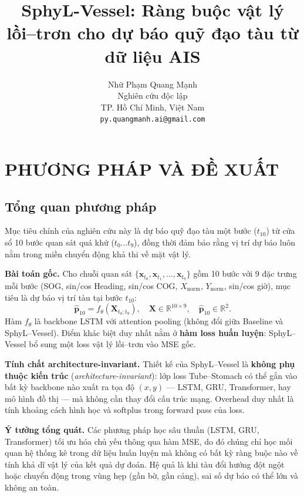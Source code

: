 \documentclass{IEEEtran}
\title{SphyL-Vessel: Ràng buộc vật lý lồi--trơn cho dự báo quỹ đạo tàu từ dữ liệu AIS}
\author{
  Nhữ Phạm Quang Mạnh\\
  Nghiên cứu độc lập\\
  TP. Hồ Chí Minh, Việt Nam\\
  \texttt{py.quangmanh.ai@gmail.com}
}
\begin{document}
\section{PHƯƠNG PHÁP VÀ ĐỀ XUẤT}

\subsection{Tổng quan phương pháp}\label{sec:overview}

Mục tiêu chính của nghiên cứu này là dự báo quỹ đạo tàu một bước
($t_{10}$) từ cửa sổ 10 bước quan sát quá khứ ($t_0 \ldots t_9$),
đồng thời đảm bảo rằng vị trí dự báo luôn nằm trong miền chuyển động
khả thi về mặt vật lý.

\textbf{Bài toán gốc.}
Cho chuỗi quan sát $\{\mathbf{x}_{t_0}, \mathbf{x}_{t_1},\ldots,\mathbf{x}_{t_9}\}$
gồm 10 bước với 9 đặc trưng mỗi bước
(SOG, sin/cos Heading, sin/cos COG, $X_\text{norm}$, $Y_\text{norm}$, sin/cos giờ),
mục tiêu là dự báo vị trí tàu tại bước $t_{10}$:
\[
\hat{\mathbf{p}}_{10} = f_\theta(\mathbf{X}_{t_0:t_9}),
\quad \mathbf{X} \in \mathbb{R}^{10\times 9},
\quad \hat{\mathbf{p}}_{10} \in \mathbb{R}^2.
\]
Hàm $f_\theta$ là backbone LSTM với attention pooling
(không đổi giữa Baseline và SphyL--Vessel).
Điểm khác biệt duy nhất nằm ở \textbf{hàm loss huấn luyện}:
SphyL--Vessel bổ sung một loss vật lý lồi--trơn vào MSE gốc.

\textbf{Tính chất architecture-invariant.}
Thiết kế của SphyL--Vessel là \textbf{không phụ thuộc kiến trúc}
(\textit{architecture-invariant}): lớp loss Tube--Stomach
có thể gắn vào bất kỳ backbone nào xuất ra tọa độ $(x, y)$
--- LSTM, GRU, Transformer, hay mô hình đồ thị ---
mà không cần thay đổi cấu trúc mạng. Overhead duy nhất là tính
khoảng cách hình học và softplus trong forward pass của loss.

\textbf{Ý tưởng tổng quát.}
Các phương pháp học sâu thuần (LSTM, GRU, Transformer) tối ưu hóa
chủ yếu thông qua hàm MSE, do đó chúng chỉ học mối quan hệ thống kê
trong dữ liệu huấn luyện mà không có bất kỳ ràng buộc nào về tính
khả dĩ vật lý của kết quả dự đoán.
Hệ quả là khi tàu đổi hướng đột ngột hoặc chuyển động trong vùng hẹp
(gần bờ, gần cảng), sai số dự báo có thể lớn và không an toàn.
\end{document}
